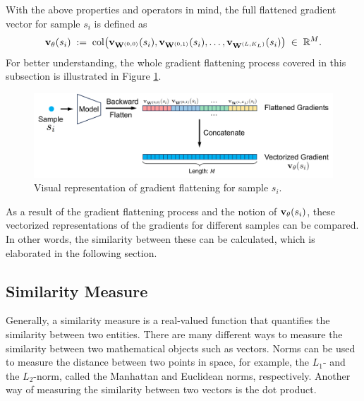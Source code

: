 With the above properties and operators in mind, the full flattened gradient vector for sample $s_i$ is defined as 
\begin{align*}
    \vXsi[\theta]
\;:=\;
\operatorname{col}\bigl( \vXsi[\W^{(0,0)}], \vXsi[\W^{(0,1)}], \dots, \vXsi[\W^{(L,K_L)}] \bigr)
\; 
\in\; \mathbb{R}^{M}.
\end{align*}
For better understanding, the whole gradient flattening process covered in this subsection is illustrated in Figure \ref{fig:gradient_flattening}.
\begin{figure}[ht]
    \centering
    \includegraphics[width=1\textwidth]{figures/gradient_flattening.png}
    \caption{Visual representation of gradient flattening for sample $s_i$.}
    \label{fig:gradient_flattening}
\end{figure}
As a result of the gradient flattening process and the notion of $\vXsi[\theta]$, these vectorized representations of the gradients for different samples can be compared. In other words, the similarity between these can be calculated, which is elaborated in the following section.

\subsection{Similarity Measure}
Generally, a similarity measure is a real-valued function that quantifies the
similarity between two entities.  There are many different ways to measure the
similarity between two mathematical objects such as vectors.  Norms can be used
to measure the distance between two points in space, for example, the $L_1$-
and the $L_2$-norm, called the Manhattan and Euclidean norms, respectively.
Another way of measuring the similarity between two vectors is the dot product.

